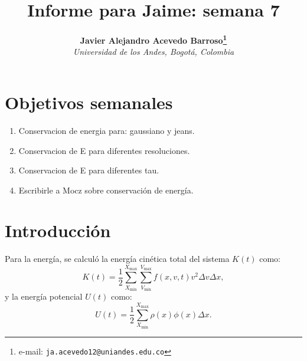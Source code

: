 \documentclass[notitlepage,letterpaper,12pt]{article} %
\begin{document}
\title{Informe para Jaime: semana 7}
\author{
\textbf{Javier Alejandro Acevedo Barroso\thanks{e-mail: \texttt{ja.acevedo12@uniandes.edu.co}}}\\
\textit{Universidad de los Andes, Bogotá, Colombia}\\
} %

\maketitle %






 

\section{Objetivos semanales}
\begin{enumerate}
\item Conservacion de energia para: gaussiano y jeans.
\item Conservacion de E para diferentes resoluciones.
\item Conservacion de E para diferentes tau.
\item Escribirle a Mocz sobre conservación de energía.
\end{enumerate}

\section{Introducción}
Para la energía, se calculó la energía cinética total del sistema $K(t)$ como:
\begin{equation}
K(t) = \frac{1}{2} \sum_{X_\text{min}}^{X_\text{max}} \sum_{V_\text{min}}^{V_\text{max}} f(x,v,t) v^2 \Delta v \Delta x,
\end{equation}
y la energía potencial $U(t)$ como:
\begin{equation}
U(t) = \frac{1}{2} \sum_{X_\text{min}}^{X_\text{max}} \rho(x) \phi(x) \Delta x.
\end{equation}
\end{document}
